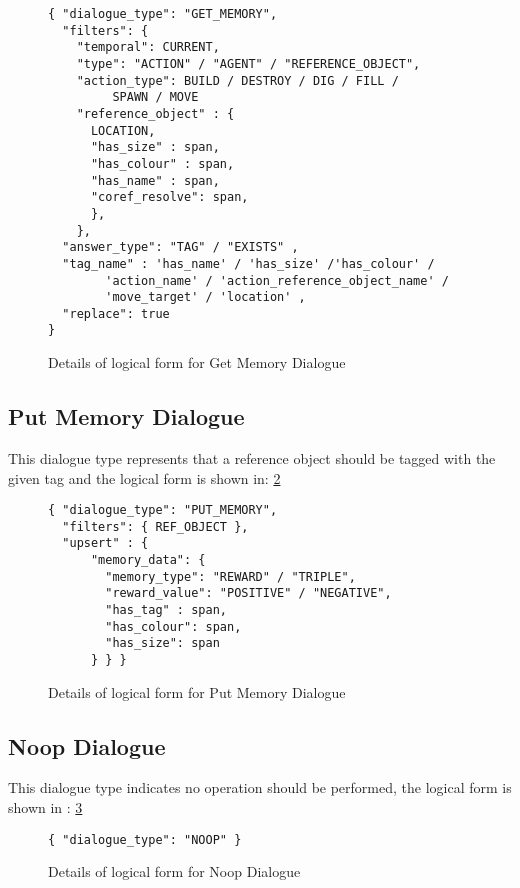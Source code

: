 \begin{figure}[ht]
    \centering
   \fontsize{8pt}{8pt}\selectfont
    
    \begin{verbatim}
{ "dialogue_type": "GET_MEMORY",
  "filters": {
    "temporal": CURRENT,
    "type": "ACTION" / "AGENT" / "REFERENCE_OBJECT",
    "action_type": BUILD / DESTROY / DIG / FILL / 
         SPAWN / MOVE
    "reference_object" : {
      LOCATION,
      "has_size" : span,
      "has_colour" : span,
      "has_name" : span,
      "coref_resolve": span,
      },
    },
  "answer_type": "TAG" / "EXISTS" ,
  "tag_name" : 'has_name' / 'has_size' /'has_colour' / 
        'action_name' / 'action_reference_object_name' / 
        'move_target' / 'location' ,
  "replace": true
}
    \end{verbatim}
    \vspace{-20pt}
    \caption{Details of logical form for Get Memory Dialogue}
    \vspace{-8pt}
    \label{fig:answer_dict}
\end{figure}


\subsection{Put Memory Dialogue}
This dialogue type represents that a reference object should be tagged with the given tag and the logical form is shown in: \ref{fig:tag_dict}


\begin{figure}[ht]
    \centering
    \fontsize{8pt}{8pt}\selectfont
    \begin{verbatim}
{ "dialogue_type": "PUT_MEMORY",
  "filters": { REF_OBJECT },
  "upsert" : {
      "memory_data": {
        "memory_type": "REWARD" / "TRIPLE",
        "reward_value": "POSITIVE" / "NEGATIVE",
        "has_tag" : span,
        "has_colour": span,
        "has_size": span
      } } }
    \end{verbatim}
    \vspace{-20pt}
    \caption{Details of logical form for Put Memory Dialogue}
    \vspace{-8pt}
    \label{fig:tag_dict}
\end{figure}



\subsection{ Noop Dialogue}
This dialogue type indicates no operation should be performed, the logical form is shown in : \ref{fig:noop_dict}

\begin{figure}[ht]
    \centering
    \fontsize{8pt}{8pt}\selectfont
    \begin{verbatim}
{ "dialogue_type": "NOOP" }
    \end{verbatim}
    \vspace{-20pt}
    \caption{Details of logical form for Noop Dialogue}
    \vspace{-8pt}
    \label{fig:noop_dict}
\end{figure}

